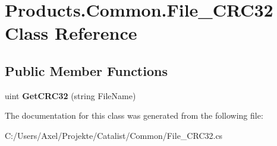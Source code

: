 \hypertarget{class_products_1_1_common_1_1_file___c_r_c32}{}\section{Products.\+Common.\+File\+\_\+\+C\+R\+C32 Class Reference}
\label{class_products_1_1_common_1_1_file___c_r_c32}
\subsection*{Public Member Functions}
\begin{DoxyCompactItemize}
\item 
uint {\bfseries Get\+C\+R\+C32} (string File\+Name)\hypertarget{class_products_1_1_common_1_1_file___c_r_c32_a74fd48ab4780afe7eac8dcd9a5c39f50}{}\label{class_products_1_1_common_1_1_file___c_r_c32_a74fd48ab4780afe7eac8dcd9a5c39f50}

\end{DoxyCompactItemize}


The documentation for this class was generated from the following file\+:\begin{DoxyCompactItemize}
\item 
C\+:/\+Users/\+Axel/\+Projekte/\+Catalist/\+Common/File\+\_\+\+C\+R\+C32.\+cs\end{DoxyCompactItemize}
